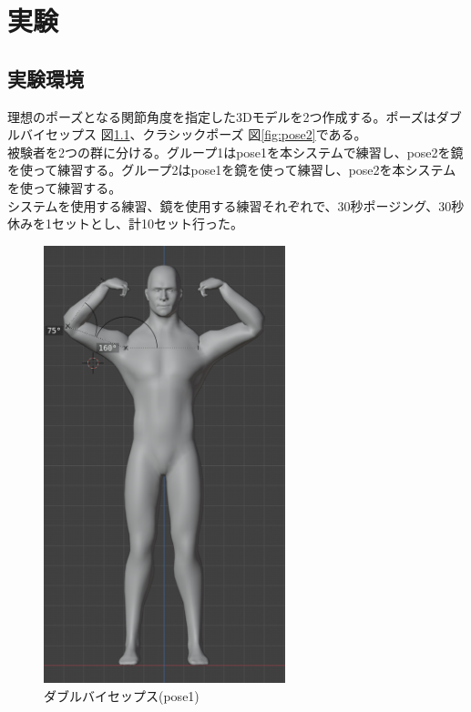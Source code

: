 \chapter{実験}
\label{implementation}


\section{実験環境}
理想のポーズとなる関節角度を指定した3Dモデルを2つ作成する。ポーズはダブルバイセップス 図\ref{fig:pose1}、クラシックポーズ 図\ref{fig:pose2}である。\\ \indent	
被験者を2つの群に分ける。グループ1はpose1を本システムで練習し、pose2を鏡を使って練習する。グループ2はpose1を鏡を使って練習し、pose2を本システムを使って練習する。
\\ \indent
システムを使用する練習、鏡を使用する練習それぞれで、30秒ポージング、30秒休みを1セットとし、計10セット行った。
\begin{figure}[htbp]
  \begin{center}
      \includegraphics[width=7cm]{figures/pose1.png}
      \caption{ダブルバイセップス(pose1)}
      \label{fig:pose1}
  \end{center}
\end{figure}
